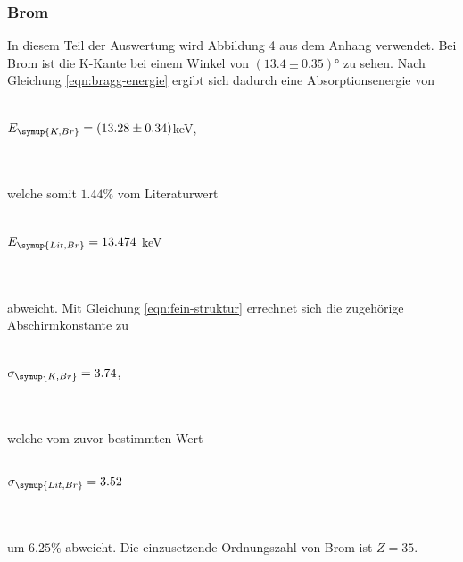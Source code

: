         \subsubsection{Brom}
            In diesem Teil der Auswertung wird Abbildung 4 aus dem Anhang verwendet.
            Bei Brom ist die K-Kante bei einem Winkel von $(13.4 \pm 0.35)°$ zu sehen. Nach 
            Gleichung \eqref{eqn:bragg-energie} ergibt sich dadurch eine Absorptionsenergie
            von 
            \\ \\
            \centerline{$E_{\symup{K, Br}} = (13.28 \pm 0.34)$keV,}
            \\ \\
            welche somit $1.44 \%$ vom Literaturwert
            \\ \\
            \centerline{$E_{\symup{Lit, Br}} = 13.474$ keV \cite{periodic}}
            \\ \\
            abweicht. Mit Gleichung \eqref{eqn:fein-struktur} errechnet sich die 
            zugehörige Abschirmkonstante zu 
            \\ \\
            \centerline{$\sigma_{\symup{K, Br}} = 3.74$,}
            \\ \\
            welche vom zuvor bestimmten Wert
            \\ \\
            \centerline{$\sigma_{\symup{Lit, Br}} = 3.52$}
            \\ \\
            um $6.25 \%$ abweicht. Die einzusetzende Ordnungszahl von Brom 
            ist $Z = 35$.
